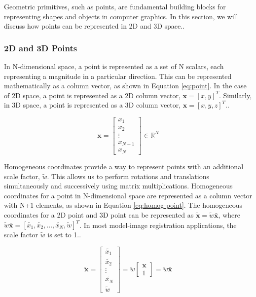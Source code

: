 Geometric primitives, such as points, are fundamental building blocks for representing shapes and objects in computer graphics. In this section, we will discuss how points can be represented in 2D and 3D space..

\subsubsection{2D and 3D Points}
In N-dimensional space, a point is represented as a set of N scalars, each representing a magnitude in a particular direction. This can be represented mathematically as a column vector, as shown in Equation \ref{eq:point}. In the case of 2D space, a point is represented as a 2D column vector, $\mathbf{x} = [x , y]^{T}$. Similarly, in 3D space, a point is represented as a 3D column vector, $\mathbf{x} = [x , y , z]^{T}$..

\begin{equation}
    \mathbf{x} = \begin{bmatrix}
        x_1 \\ x_2 \\ \vdots \\ x_{N-1} \\ x_N
    \end{bmatrix} \in \mathbb{R}^N
    \label{eq:point}
\end{equation}

Homogeneous coordinates provide a way to represent points with an additional scale factor, $\tilde{w}$. This allows us to perform rotations and translations simultaneously and successively using matrix multiplications. Homogeneous coordinates for a point in N-dimensional space are represented as a column vector with N+1 elements, as shown in Equation \ref{eq:homog-point}. The homogeneous coordinates for a 2D point and 3D point can be represented as $\tilde{\mathbf{x}} = \tilde{w}\bar{\mathbf{x}}$, where $\tilde{w}\bar{\mathbf{x}} = [\tilde{x_1} , \tilde{x_2}, \dots, \tilde{x_N} , \tilde{w}]^{T}$. In most model-image registration applications, the scale factor $\tilde{w}$ is set to 1..

\begin{equation}
    \tilde{\mathbf{x}} = \begin{bmatrix}
        \tilde{x_1} \\ \tilde{x_2} \\ \vdots \\ \tilde{x_N} \\ \tilde{w}
    \end{bmatrix} = \tilde{w}\begin{bmatrix}
        \mathbf{x}\\ 1
    \end{bmatrix} = \tilde{w}\bar{\mathbf{x}}
    \label{eq:homog-point}
\end{equation}

